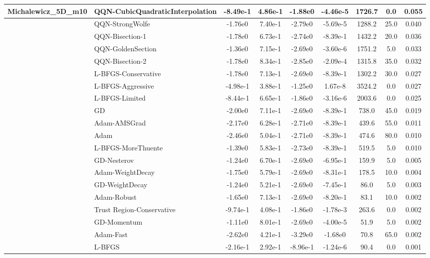 \documentclass[10pt]{article}
\begin{document}
\begin{longtable}{|l|l|c|c|c|c|c|c|c|}
Michalewicz\_5D\_m10 & \textbf{QQN-CubicQuadraticInterpolation} & -8.49e-1 & 4.86e-1 & -1.88e0 & -4.46e-5 & 1726.7 & 0.0 & 0.055 \\
\hline
 & QQN-StrongWolfe & -1.76e0 & 7.40e-1 & -2.79e0 & -5.69e-5 & 1288.2 & 25.0 & 0.040 \\
\hline
 & QQN-Bisection-1 & -1.78e0 & 6.73e-1 & -2.74e0 & -8.39e-1 & 1432.2 & 20.0 & 0.036 \\
\hline
 & QQN-GoldenSection & -1.36e0 & 7.15e-1 & -2.69e0 & -3.60e-6 & 1751.2 & 5.0 & 0.033 \\
\hline
 & QQN-Bisection-2 & -1.78e0 & 8.34e-1 & -2.85e0 & -2.09e-4 & 1315.8 & 35.0 & 0.032 \\
\hline
 & L-BFGS-Conservative & -1.78e0 & 7.13e-1 & -2.69e0 & -8.39e-1 & 1302.2 & 30.0 & 0.027 \\
\hline
 & L-BFGS-Aggressive & -4.98e-1 & 3.88e-1 & -1.25e0 & 1.67e-8 & 3524.2 & 0.0 & 0.027 \\
\hline
 & L-BFGS-Limited & -8.44e-1 & 6.65e-1 & -1.86e0 & -3.16e-6 & 2003.6 & 0.0 & 0.025 \\
\hline
 & GD & -2.00e0 & 7.11e-1 & -2.69e0 & -8.39e-1 & 738.0 & 45.0 & 0.019 \\
\hline
 & Adam-AMSGrad & -2.17e0 & 6.28e-1 & -2.71e0 & -8.39e-1 & 439.6 & 55.0 & 0.011 \\
\hline
 & Adam & -2.46e0 & 5.04e-1 & -2.71e0 & -8.39e-1 & 474.6 & 80.0 & 0.010 \\
\hline
 & L-BFGS-MoreThuente & -1.39e0 & 5.83e-1 & -2.73e0 & -8.39e-1 & 519.5 & 5.0 & 0.010 \\
\hline
 & GD-Nesterov & -1.24e0 & 6.70e-1 & -2.69e0 & -6.95e-1 & 159.9 & 5.0 & 0.005 \\
\hline
 & Adam-WeightDecay & -1.75e0 & 5.79e-1 & -2.69e0 & -8.31e-1 & 178.5 & 10.0 & 0.004 \\
\hline
 & GD-WeightDecay & -1.24e0 & 5.21e-1 & -2.69e0 & -7.45e-1 & 86.0 & 5.0 & 0.003 \\
\hline
 & Adam-Robust & -1.65e0 & 7.13e-1 & -2.69e0 & -8.20e-1 & 83.1 & 10.0 & 0.002 \\
\hline
 & Trust Region-Conservative & -9.74e-1 & 4.08e-1 & -1.86e0 & -1.78e-3 & 263.6 & 0.0 & 0.002 \\
\hline
 & GD-Momentum & -1.11e0 & 8.01e-1 & -2.69e0 & -4.00e-5 & 51.9 & 5.0 & 0.002 \\
\hline
 & Adam-Fast & -2.62e0 & 4.21e-1 & -3.29e0 & -1.68e0 & 70.8 & 65.0 & 0.002 \\
\hline
 & L-BFGS & -2.16e-1 & 2.92e-1 & -8.96e-1 & -1.24e-6 & 90.4 & 0.0 & 0.001 \\

\end{longtable}
\end{document}

